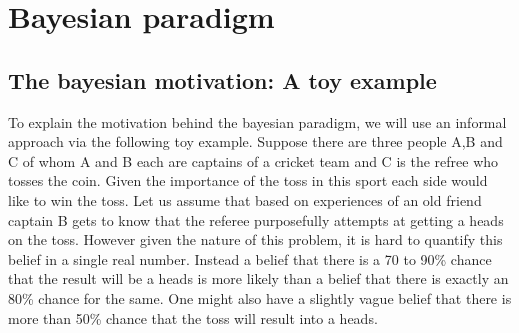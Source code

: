 
\chapter{Bayesian paradigm}
\label{ch : bayesian_paradigm}

\section{The bayesian motivation: A toy example}
To explain the motivation behind the bayesian paradigm, we will use an informal approach via the following toy example. Suppose there are three people A,B and C of whom A and B each are captains of a cricket team and C is the refree who tosses the coin. Given the importance of the toss in this sport each side would like to win the toss. Let us assume that based on experiences of an old friend captain B gets to know that the referee purposefully attempts at getting a heads on the toss. However given the nature of this problem, it is hard to quantify this belief in a single real number. Instead a belief that there is a 70 to 90\% chance that the result will be a heads is more likely than a belief that there is exactly an 80\% chance for the same. One might also have a slightly vague belief that there is more than 50\% chance that the toss will result into a heads. \\

